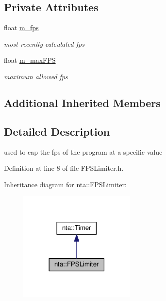 \subsection*{Private Attributes}
\begin{DoxyCompactItemize}
\item 
\mbox{\label{classnta_1_1FPSLimiter_a06b2818f3bff96da37768829af13df2d}} 
float \hyperlink{classnta_1_1FPSLimiter_a06b2818f3bff96da37768829af13df2d}{m\+\_\+fps}
\begin{DoxyCompactList}\small\item\em most recently calculated fps \end{DoxyCompactList}\item 
\mbox{\label{classnta_1_1FPSLimiter_ae4a323afb44da70acd962cc4c395183d}} 
float \hyperlink{classnta_1_1FPSLimiter_ae4a323afb44da70acd962cc4c395183d}{m\+\_\+max\+F\+PS}
\begin{DoxyCompactList}\small\item\em maximum allowed fps \end{DoxyCompactList}\end{DoxyCompactItemize}
\subsection*{Additional Inherited Members}


\subsection{Detailed Description}
used to cap the fps of the program at a specific value 

Definition at line 8 of file F\+P\+S\+Limiter.\+h.



Inheritance diagram for nta\+:\+:F\+P\+S\+Limiter\+:\nopagebreak
\begin{figure}[H]
\begin{center}
\leavevmode
\includegraphics[width=165pt]{de/d03/classnta_1_1FPSLimiter__inherit__graph}
\end{center}
\end{figure}



